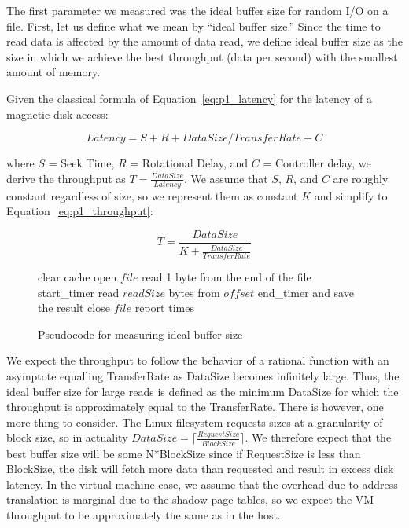 The first parameter we measured was the ideal buffer size for random I/O 
on a file. First, let us define what we mean by ``ideal buffer size.'' Since
the time to read data is affected by the amount of data read, we define ideal
buffer size as the size in which we achieve the best throughput (data per second)
with the smallest amount of memory. 

Given the classical formula of Equation~\ref{eq:p1_latency} for the latency 
of a magnetic disk access:

\begin{equation}\label{eq:p1_latency}
Latency = S + R + DataSize/TransferRate + C
\end{equation}

where $S$ = Seek Time, $R$ = Rotational Delay, and $C$ = Controller delay, we 
derive the throughput as $T = \frac{DataSize}{Latency}$. We assume that $S$, $R$, 
and $C$ are roughly constant regardless of size, so we represent them as constant 
$K$ and simplify to Equation~\ref{eq:p1_throughput}:

\begin{equation}\label{eq:p1_throughput}
T = \frac{DataSize}{K + \frac{DataSize}{TransferRate}}
\end{equation}

\begin{figure}[b!]
\begin{algorithmic}
   \STATE clear cache
   \STATE open $file$
   \STATE read 1 byte from the end of the file
   \STATE start\_timer
   \STATE read $readSize$ bytes from $offset$
   \STATE end\_timer and save the result
   \STATE close $file$
   \STATE report times
\ENDFOR
\end{algorithmic}
\caption{Pseudocode for measuring ideal buffer size}
\label{fig:p1code}
\end{figure}

We expect the throughput to follow the behavior of a rational function
with an asymptote equalling TransferRate as DataSize becomes infinitely large.
Thus, the ideal buffer size for large reads is defined as the minimum DataSize for 
which the throughput is approximately equal to the TransferRate. There is however, 
one more thing to consider. The Linux filesystem requests sizes at a granularity of 
block size, so in actuality $DataSize = \lceil\frac{RequestSize}{BlockSize}\rceil$.
We therefore expect that the best buffer size will be some N*BlockSize since
if RequestSize is less than BlockSize, the disk will fetch more data than
requested and result in excess disk latency. In the virtual machine case, we assume 
that the overhead due to address translation is marginal due to the shadow page 
tables, so we expect the VM throughput to be approximately the same as in the host.

